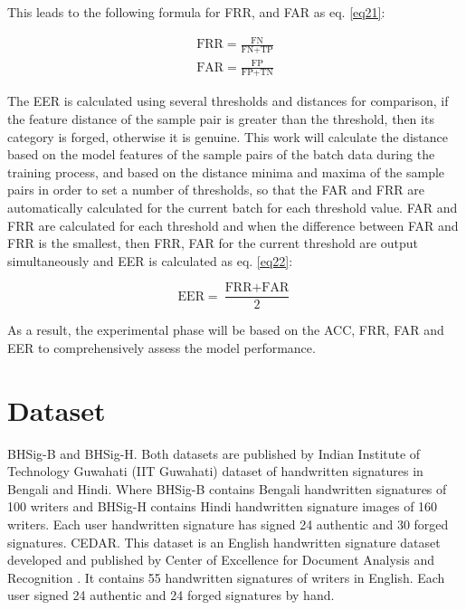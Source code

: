 This leads to the following formula for FRR, and FAR as eq. \ref{eq21}:

\begin{equation}
\label{eq21}
\begin{aligned}
	\text{FRR}=\frac{\text{FN}}{\text{FN}+\text{TP}} \\
	\text{FAR}=\frac{\text{FP}}{\text{FP}+\text{TN}}
\end{aligned}
\end{equation}

The EER is calculated using several thresholds and distances for comparison, if the feature distance of the sample pair is greater than the threshold, then its category is forged, otherwise it is genuine. This work will calculate the distance based on the model features of the sample pairs of the batch data during the training process, and based on the distance minima and maxima of the sample pairs in order to set a number of thresholds, so that the FAR and FRR are automatically calculated for the current batch for each threshold value. FAR and FRR are calculated for each threshold and when the difference between FAR and FRR is the smallest, then FRR, FAR for the current threshold are output simultaneously and EER is calculated as eq. \ref{eq22}:

\begin{equation}
\label{eq22}
	\text{EER} = \frac{\text{FRR}+\text{FAR}}{2}	
\end{equation}
	
As a result, the experimental phase will be based on the ACC, FRR, FAR and EER to comprehensively assess the model performance.

\newpage
\section{Dataset}

BHSig-B and BHSig-H. Both datasets are published by Indian Institute of Technology Guwahati (IIT Guwahati) \cite{3} dataset of handwritten signatures in Bengali and Hindi. Where BHSig-B contains Bengali handwritten signatures of 100 writers and BHSig-H contains Hindi handwritten signature images of 160 writers. Each user handwritten signature has signed 24 authentic and 30 forged signatures.
CEDAR. This dataset is an English handwritten signature dataset developed and published by Center of Excellence for Document Analysis and Recognition \cite{30}. It contains 55 handwritten signatures of writers in English. Each user signed 24 authentic and 24 forged signatures by hand.

